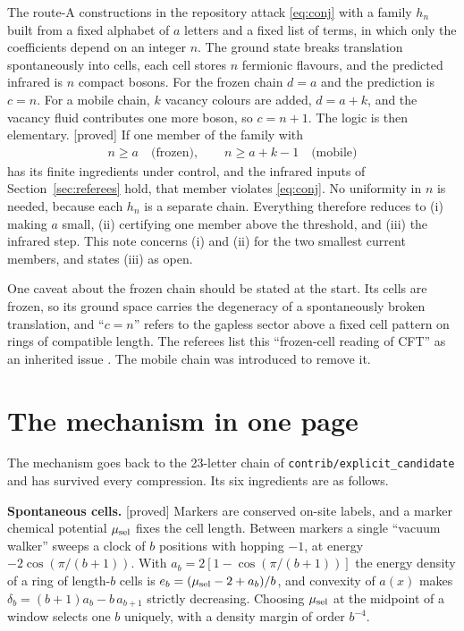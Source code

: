 \documentclass[11pt]{article}
\newcommand{\tg}[1]{\textsf{[#1]}}
\newcommand{\repo}[1]{\texttt{#1}}
\begin{document}
The route-A constructions in the repository attack \eqref{eq:conj} with a family $h_n$ built from a fixed alphabet of $a$ letters and a fixed list of terms, in which only the coefficients depend on an integer $n$. The ground state breaks translation spontaneously into cells, each cell stores $n$ fermionic flavours, and the predicted infrared is $n$ compact bosons. For the frozen chain $d=a$ and the prediction is $c=n$. For a mobile chain, $k$ vacancy colours are added, $d=a+k$, and the vacancy fluid contributes one more boson, so $c=n+1$. The logic is then elementary. \tg{proved} If one member of the family with
\begin{align}
n\ge a \quad\text{(frozen)},\qquad n\ge a+k-1\quad\text{(mobile)}\label{eq:threshold}
\end{align}
has its finite ingredients under control, and the infrared inputs of Section~\ref{sec:referees} hold, that member violates \eqref{eq:conj}. No uniformity in $n$ is needed, because each $h_n$ is a separate chain. Everything therefore reduces to (i) making $a$ small, (ii) certifying one member above the threshold, and (iii) the infrared step. This note concerns (i) and (ii) for the two smallest current members, and states (iii) as open.

One caveat about the frozen chain should be stated at the start. Its cells are frozen, so its ground space carries the degeneracy of a spontaneously broken translation, and ``$c=n$'' refers to the gapless sector above a fixed cell pattern on rings of compatible length. The referees list this ``frozen-cell reading of CFT'' as an inherited issue \cite{refC80}. The mobile chain was introduced to remove it.

\section{The mechanism in one page}\label{sec:mech}

The mechanism goes back to the 23-letter chain of \repo{contrib/explicit\_candidate} and has survived every compression. Its six ingredients are as follows.

\textbf{Spontaneous cells.} \tg{proved} Markers are conserved on-site labels, and a marker chemical potential $\mu_{\rm sel}$ fixes the cell length. Between markers a single ``vacuum walker'' sweeps a clock of $b$ positions with hopping $-1$, at energy $-2\cos(\pi/(b+1))$. With $a_b=2[1-\cos(\pi/(b+1))]$ the energy density of a ring of length-$b$ cells is $e_b=(\mu_{\rm sel}-2+a_b)/b$, and convexity of $a(x)$ makes $\delta_b=(b+1)a_b-b\,a_{b+1}$ strictly decreasing. Choosing $\mu_{\rm sel}$ at the midpoint of a window selects one $b$ uniquely, with a density margin of order $b^{-4}$.
\end{document}
